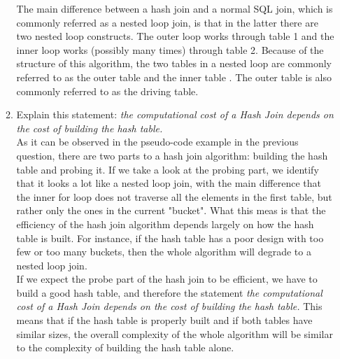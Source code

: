 \documentclass{article}
\begin{document}
\begin{enumerate}[label=(\alph*)]
\begin{enumerate}[label=\arabic*.]
The main difference between a hash join and a normal SQL join, which is commonly referred as a nested loop join, is that in the latter there are two nested loop constructs. The outer loop works through table 1 and the inner loop works (possibly many times) through table 2. Because of the structure of this algorithm, the two tables in a nested loop are commonly referred to as the outer table and the inner table . The outer table is also commonly referred to as the driving table.
\newline

            \item Explain this statement: \emph{the computational cost of a Hash Join depends on the cost of building the hash table.}\\
\newline
As it can be observed in the pseudo-code example in the previous question, there are two parts to a hash join algorithm: building the hash table and probing it. If we take a look at the probing part, we identify that it looks a lot like a nested loop join, with the main difference that the inner for loop does not traverse all the elements in the first table, but rather only the ones in the current "bucket". What this meas is that the efficiency of the hash join algorithm depends largely on how the hash table is built. For instance, if the hash table has a poor design with too few or too many buckets, then the whole algorithm will degrade to a nested loop join.\\
If we expect the probe part of the hash join to be efficient, we have to build a good hash table, and therefore the statement \emph{the computational cost of a Hash Join depends on the cost of building the hash table.} This means that if the hash table is properly built and if both tables have similar sizes, the overall complexity of the whole algorithm will be similar to the complexity of building the hash table alone.
        \end{enumerate}
    \end{enumerate}
    
\end{document}

